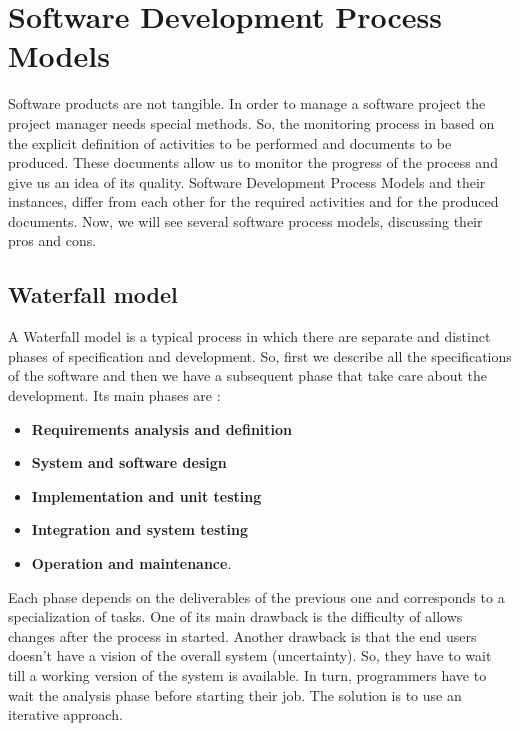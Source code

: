 \section{Software Development Process Models}
Software products are not tangible. In order to manage a software project the project manager needs special methods. So, the monitoring process in based on the explicit definition of activities to be performed and documents to be produced. These documents allow us to monitor the progress of the process and give us an idea of its quality. Software Development Process Models and their instances, differ from each other for the required activities and for the produced documents. Now, we will see several software process models, discussing their pros and cons.
\subsection{Waterfall model}
A Waterfall model is a typical process in which there are separate and distinct phases of specification and development. So, first we describe all the specifications of the software and then we have a subsequent phase that take care about the development. Its main phases are :
\begin{itemize}
    \item \textbf{Requirements analysis and definition}
    \item \textbf{System and software design}
    \item \textbf{Implementation and unit testing}
    \item \textbf{Integration and system testing}
    \item \textbf{Operation and maintenance}.
\end{itemize}
Each phase depends on the deliverables of the previous one and corresponds to a specialization of tasks. One of its main drawback is the difficulty of allows changes after the process in started. Another drawback is that the end users doesn't have a vision of the overall system (uncertainty). So, they have to wait till a working version of the system is available. In turn, programmers have to wait the analysis phase before starting their job. The solution is to use an iterative approach.

